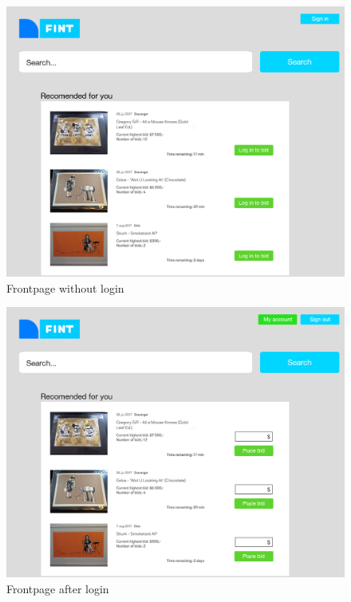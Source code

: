 \begin{figure}[H]
  \caption{Frontpage without login}
  \centering
    \includegraphics[scale=0.38]{figures/Frontpage}
\end{figure}

\begin{figure}
	\caption{Frontpage after login}
	\centering
		\includegraphics[scale=0.38]{figures/Frontpage-after-login}
\end{figure}

